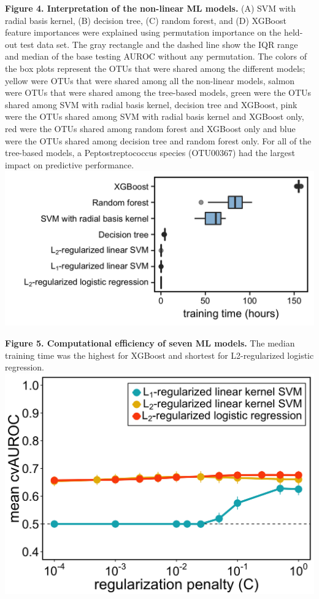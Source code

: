 \documentclass[11pt,]{article}
\begin{document}
\textbf{Figure 4. Interpretation of the non-linear ML models.} (A) SVM
with radial basis kernel, (B) decision tree, (C) random forest, and (D)
XGBoost feature importances were explained using permutation importance
on the held-out test data set. The gray rectangle and the dashed line
show the IQR range and median of the base testing AUROC without any
permutation. The colors of the box plots represent the OTUs that were
shared among the different models; yellow were OTUs that were shared
among all the non-linear models, salmon were OTUs that were shared among
the tree-based models, green were the OTUs shared among SVM with radial
basis kernel, decision tree and XGBoost, pink were the OTUs shared among
SVM with radial basis kernel and XGBoost only, red were the OTUs shared
among random forest and XGBoost only and blue were the OTUs shared among
decision tree and random forest only. For all of the tree-based models,
a Peptostreptococcus species (OTU00367) had the largest impact on
predictive performance. \newpage
\includegraphics{Figure_5.png}

\textbf{Figure 5. Computational efficiency of seven ML models.} The
median training time was the highest for XGBoost and shortest for
L2-regularized logistic regression. \newpage
\includegraphics{Figure_S1.png}
\end{document}
